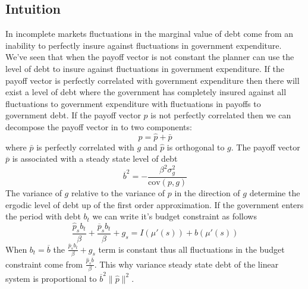 \documentclass[12pt]{article}
\newcommand{\pbar}{{\overline p}}
\newcommand{\bbar}{{\overline b}}
\newcommand{\cov}{{\text{cov}}}
\begin{document}
\subsection{Intuition}
In incomplete markets fluctuations in the marginal value of debt come from an inability to perfectly insure against fluctuations in government expenditure.  We've seen that when the payoff vector is not constant the planner can use the level of debt to insure against fluctuations in government expenditure.  If the payoff vector is perfectly correlated with government expenditure then there will exist a level of debt where the government has completely insured against all fluctuations to government expenditure with fluctuations in payoffs to government debt.  If the payoff vector $p$ is not perfectly correlated then we can decompose the payoff vector in to two components: 
\[
	p = \hat p + \bar p
\]where $\bar p$ is perfectly correlated with $g$ and $\hat p$ is orthogonal to $g$.  The payoff vector $\pbar$ is associated with a steady state level of debt
\[
	\bbar^2 = -\frac{\beta^2\sigma_g^2}{\cov(p,g)}
\]The variance of $g$ relative to the variance of $p$ in the direction of $g$ determine the ergodic level of debt up of the  first order approximation.  If the government enters the period with debt $b_t$ we can write it's budget constraint as follows
\[
	\frac{\hat p_s b_t}{\beta} + \frac{\pbar_s b_t}{\beta} + g_s = I(\mu'(s)) + b(\mu'(s))
\]When $b_t = \bbar$ the $\frac{\pbar_s b_t}{\beta} + g_s$ term is constant thus all fluctuations in the budget constraint come from $\frac{\hat p_s \bbar}{\beta}$.  This why variance steady state debt of the linear system is proportional to $\bbar^2\|\hat p\|^2$.
\end{document}
